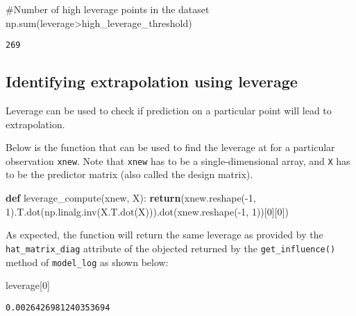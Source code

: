 \documentclass[
  letterpaper,
  DIV=11,
  numbers=noendperiod]{scrreprt}
\newenvironment{Shaded}{\begin{snugshade}}{\end{snugshade}}
\newcommand{\BuiltInTok}[1]{\textcolor[rgb]{0.00,0.23,0.31}{#1}}
\newcommand{\CommentTok}[1]{\textcolor[rgb]{0.37,0.37,0.37}{#1}}
\newcommand{\ControlFlowTok}[1]{\textcolor[rgb]{0.00,0.23,0.31}{\textbf{#1}}}
\newcommand{\DecValTok}[1]{\textcolor[rgb]{0.68,0.00,0.00}{#1}}
\newcommand{\KeywordTok}[1]{\textcolor[rgb]{0.00,0.23,0.31}{\textbf{#1}}}
\newcommand{\NormalTok}[1]{\textcolor[rgb]{0.00,0.23,0.31}{#1}}
\newcommand{\OperatorTok}[1]{\textcolor[rgb]{0.37,0.37,0.37}{#1}}
\begin{document}
\begin{Shaded}
\begin{Highlighting}[]
\CommentTok{\#Number of high leverage points in the dataset}
\NormalTok{np.}\BuiltInTok{sum}\NormalTok{(leverage}\OperatorTok{\textgreater{}}\NormalTok{high\_leverage\_threshold)}
\end{Highlighting}
\end{Shaded}

\begin{verbatim}
269
\end{verbatim}

\subsection{Identifying extrapolation using
leverage}\label{identifying-extrapolation-using-leverage}

Leverage can be used to check if prediction on a particular point will
lead to extrapolation.

Below is the function that can be used to find the leverage at for a
particular observation \texttt{xnew}. Note that \texttt{xnew} has to be
a single-dimensional array, and \texttt{X} has to be the predictor
matrix (also called the design matrix).

\begin{Shaded}
\begin{Highlighting}[]
\KeywordTok{def}\NormalTok{ leverage\_compute(xnew, X):}
    \ControlFlowTok{return}\NormalTok{(xnew.reshape(}\OperatorTok{{-}}\DecValTok{1}\NormalTok{, }\DecValTok{1}\NormalTok{).T.dot(np.linalg.inv(X.T.dot(X))).dot(xnew.reshape(}\OperatorTok{{-}}\DecValTok{1}\NormalTok{, }\DecValTok{1}\NormalTok{))[}\DecValTok{0}\NormalTok{][}\DecValTok{0}\NormalTok{])}
\end{Highlighting}
\end{Shaded}

As expected, the function will return the same leverage as provided by
the \texttt{hat\_matrix\_diag} attribute of the objected returned by the
\texttt{get\_influence()} method of \texttt{model\_log} as shown below:

\begin{Shaded}
\begin{Highlighting}[]
\NormalTok{leverage[}\DecValTok{0}\NormalTok{]}
\end{Highlighting}
\end{Shaded}

\begin{verbatim}
0.0026426981240353694
\end{verbatim}
\end{document}
